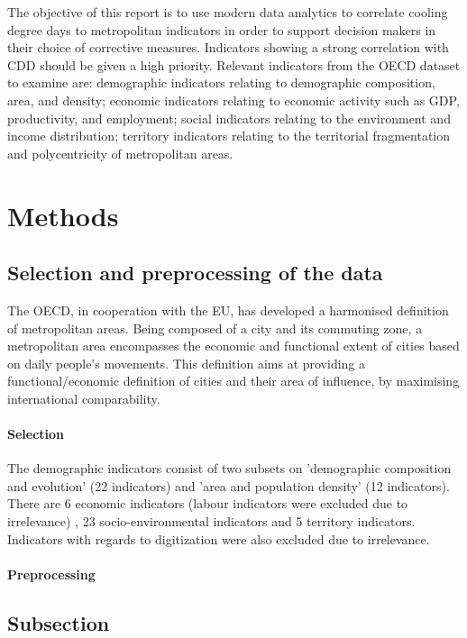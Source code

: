 \documentclass[fleqn,10pt]{SelfArx} %
\begin{document}
The objective of this report is to use modern data analytics to correlate cooling degree days to metropolitan indicators in order to support decision makers in their choice of corrective measures.  Indicators showing a strong correlation with CDD should be given a high priority.  Relevant indicators from the OECD dataset to examine are: demographic indicators relating to demographic composition, area, and density; economic indicators relating to economic activity such as GDP, productivity, and employment; social indicators relating to the environment and income distribution; territory indicators relating to the territorial fragmentation and polycentricity of metropolitan areas.

\section{Methods}

\subsection{Selection and preprocessing of the data}

The  OECD, in cooperation with the EU, has developed a harmonised definition of metropolitan areas.  Being composed of a city and its commuting zone,  a metropolitan area encompasses the economic and functional extent of cities based on daily people’s movements. This definition aims at providing a functional/economic definition of cities and their area of influence, by maximising international comparability.

\paragraph{Selection} The demographic indicators consist of two subsets on 'demographic composition and evolution' (22 indicators) and 'area and population density' (12 indicators).  There are 6 economic indicators (labour indicators were excluded due to irrelevance) , 23 socio-environmental indicators and 5 territory indicators. Indicators with regards to digitization were also excluded due to irrelevance.
\paragraph{Preprocessing} 

\subsection{Subsection}
\end{document}
